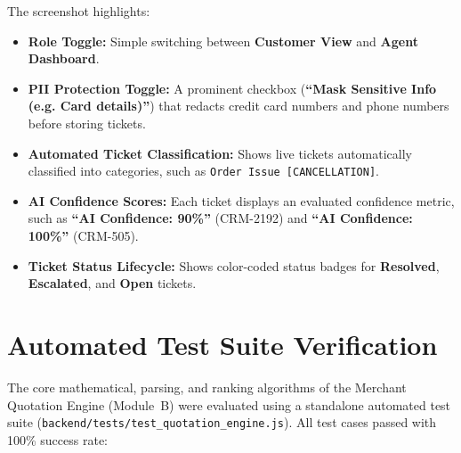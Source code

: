The screenshot highlights:
\begin{itemize}
    \item \textbf{Role Toggle:} Simple switching between \textbf{Customer View} and \textbf{Agent Dashboard}.
    \item \textbf{PII Protection Toggle:} A prominent checkbox (\textbf{``Mask Sensitive Info (e.g. Card details)''}) that redacts credit card numbers and phone numbers before storing tickets.
    \item \textbf{Automated Ticket Classification:} Shows live tickets automatically classified into categories, such as \texttt{Order Issue [CANCELLATION]}.
    \item \textbf{AI Confidence Scores:} Each ticket displays an evaluated confidence metric, such as \textbf{``AI Confidence: 90\%''} (CRM-2192) and \textbf{``AI Confidence: 100\%''} (CRM-505).
    \item \textbf{Ticket Status Lifecycle:} Shows color-coded status badges for \textbf{Resolved}, \textbf{Escalated}, and \textbf{Open} tickets.
\end{itemize}

\section{Automated Test Suite Verification}

The core mathematical, parsing, and ranking algorithms of the Merchant Quotation Engine (Module~B) were evaluated using a standalone automated test suite (\texttt{backend/tests/test\_quotation\_engine.js}). All test cases passed with 100\% success rate:

